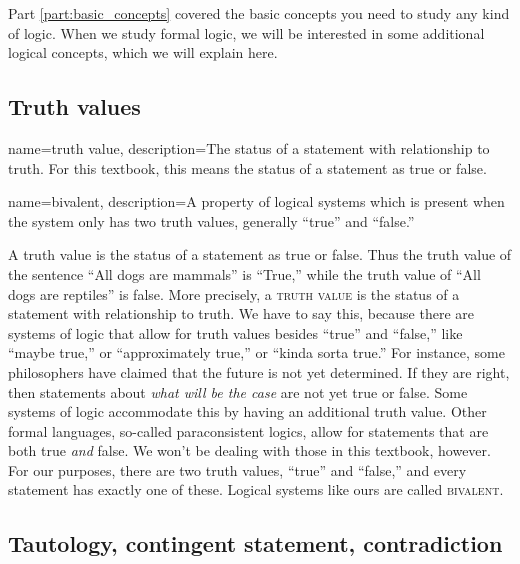 Part \ref{part:basic_concepts} covered the basic concepts you need to study any kind of logic. When we study formal logic, we will be interested in some additional logical concepts, which we will explain here. 


\subsection{Truth values}

{
  name=truth value,
  description={The status of a statement with relationship to truth. For this textbook, this means the status of a statement as true or false.}
}

{
  name=bivalent,
  description={A property of logical systems which is present when the system only has two truth values, generally ``true'' and ``false.''}
}



A truth value is the status of a statement as true or false. Thus the truth value of the sentence ``All dogs are mammals'' is ``True,'' while the truth value of ``All dogs are reptiles'' is false. More precisely, a \textsc{\gls{truth value}} \label{def:Truth_value} is the status of a statement with relationship to truth. We have to say this, because there are systems of logic that allow for truth values besides ``true'' and ``false,'' like ``maybe true,'' or ``approximately true,'' or ``kinda sorta true.'' For instance, some philosophers have claimed that the future is not yet determined. If they are right, then statements about \emph{what will be the case} are not yet true or false. Some systems of logic accommodate this by having an additional truth value. Other formal languages, so-called paraconsistent logics, allow for statements that are both true \emph{and} false. We won't be dealing with those in this textbook, however. For our purposes, there are two truth values, ``true'' and ``false,'' and every statement has exactly one of these. Logical systems like ours are called \textsc{\gls{bivalent}}. \label{def:Bivalent}








\subsection{Tautology, contingent statement, contradiction}

